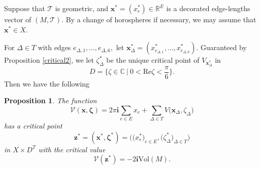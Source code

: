 \documentclass[11pt]{article}
\newtheorem{proposition}[theorem]{Proposition}
\theoremstyle{remark}
\theoremstyle{remark}
\numberwithin{equation}{section}
\begin{document}
Suppose that $\mathcal T$ is geometric, and  $\boldsymbol x^*=(x_e^*)\in \mathbb R^E$ is a decorated edge-lengths vector of $(M,\mathcal T).$ By a change of horospheres if necessary, we may assume that $\boldsymbol x^* \in X.$ 

For $\Delta\in T$ with edges $e_{\Delta,1},\dots,e_{\Delta,6},$ let 
 $\boldsymbol x^*_{\Delta}=(x^*_{e_{\Delta,1}},\dots,x^*_{e_{\Delta,6}}).$ 
Guaranteed by Proposition \ref{critical2}, 
we let $\zeta^*_{\Delta}$ be the unique critical point of $V_{\boldsymbol x^*_{\Delta}}$ in 
$$D=\Big\{ \zeta\in\mathbb C\ \Big|\ 0 < \mathrm{Re}\zeta < \frac{\pi}{6}\Big\}.$$ 
Then we have the following 
 




\begin{proposition}\label{cp} 
The function 
$$\mathcal V(\boldsymbol x, \boldsymbol \zeta)=2\pi\mathbf i\sum_{e\in E} x_e+\sum_{\Delta\in T}V\big(\boldsymbol x_\Delta,\zeta_\Delta\big)$$  has a critical point 
$$\boldsymbol z^*=(\boldsymbol x^* ,\boldsymbol \zeta^* )=\Big(\big(x^*_e\big)_{e\in E},\big(\zeta^*_{\Delta}\big)_{\Delta\in T}\Big)$$
in $X\times D^T$
with the critical value
$$\mathcal V(\boldsymbol z^*)=-2\mathbf i\mathrm{Vol}(M).$$ 
\end{proposition}
\end{document}
